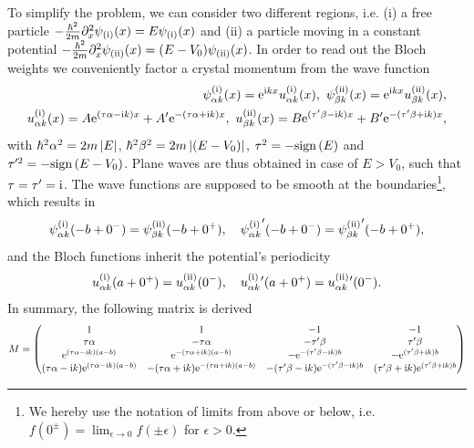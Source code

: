To simplify the problem, we can consider two different regions, i.e. (i) a free particle $-\frac{\hbar^2}{2m}\partial_x^2\psi_{\rm (i)}(x) = E\psi_{\rm (i)}(x)$ and (ii) a particle moving in a constant potential $-\frac{\hbar^2}{2m}\partial_x^2\psi_{\rm (ii)}(x) = (E-V_0)\psi_{\rm (ii)}(x)$.
In order to read out the Bloch weights we conveniently factor a crystal momentum from the wave function
\begin{align}
    \psi_{\alpha k}^{\rm (i)}(x) = \mathrm e^{\mathrm i kx}u_{\alpha k}^{\rm (i)}(x),
    \
    \psi_{\beta k}^{\rm (ii)}(x) = \mathrm e^{\mathrm i kx}u_{\beta k}^{\rm (ii)}(x),
    \\
    u_{\alpha k}^{\rm (i)}(x) = A\mathrm e^{(\tau\alpha-\mathrm i k) x} + A'\mathrm e^{-(\tau\alpha+\mathrm i k) x},
    \
    u_{\beta k}^{\rm (ii)}(x) = B\mathrm e^{(\tau'\beta-\mathrm i k) x} + B'\mathrm e^{-(\tau'\beta+\mathrm i k) x},
\end{align}
with $\hbar^2\alpha^2 = 2m\left| E \right|$, $\hbar^2\beta^2 = 2m\left| (E-V_0) \right|$, $\tau^2=-\text{sign}\left( E \right)$ and $\tau'^2=-\text{sign}\left( E-V_0 \right)$.
Plane waves are thus obtained in case of $E>V_0$, such that $\tau=\tau'=\mathrm i$.
The wave functions are supposed to be smooth at the boundaries\footnote{We hereby use the notation of limits from above or below, i.e. $f(0^\pm)=\lim_{\epsilon\rightarrow0}f(\pm\epsilon)$ for $\epsilon>0$.}, which results in
\begin{align}
    \psi_{\alpha k}^{\rm (i)}(-b+0^-)=\psi_{\beta k}^{\rm (ii)}(-b+0^+),
    \quad
    {\psi_{\alpha k}^{\rm (i)}}'(-b+0^-)={\psi_{\beta k}^{\rm (ii)}}'(-b+0^+),
\end{align}
and the Bloch functions inherit the potential's periodicity
\begin{align}
    u_{\alpha k}^{\rm (i)}(a+0^+) = u_{\alpha k}^{\rm (ii)}(0^-),
    \quad
    u_{\alpha k}^{\rm (i)}{}'(a+0^+) = u_{\alpha k}^{\rm (ii)}{}'(0^-).
\end{align}
In summary, the following matrix is derived
{\footnotesize
\begin{align}
    M =
    \begin{pmatrix}
        1 & 1 & -1 & -1\\
        \tau\alpha & -\tau\alpha & -\tau'\beta & \tau'\beta\\
        \mathrm e^{(\tau \alpha-\mathrm i k)(a-b)}  & \mathrm e^{-(\tau \alpha+\mathrm i k) (a-b)} &
        -\mathrm e^{-(\tau'\beta -\mathrm i k)b}     & -\mathrm e^{ (\tau'\beta+\mathrm i k)b} \\
        (\tau \alpha-\mathrm i k)\mathrm e^{(\tau \alpha-\mathrm i k)(a-b)}  & -(\tau \alpha+\mathrm i k)\mathrm e^{-(\tau \alpha+\mathrm i k) (a-b)} &
        -(\tau'\beta -\mathrm i k)\mathrm e^{-(\tau'\beta -\mathrm i k)b}     & (\tau'\beta+\mathrm i k)\mathrm e^{ (\tau'\beta+\mathrm i k)b} \nonumber\\
    \end{pmatrix}
\end{align}
}%
